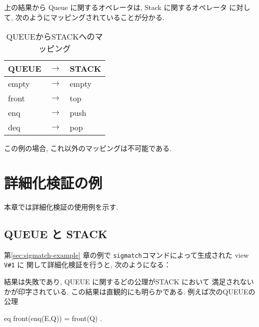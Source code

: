 上の結果から Queue に関するオペレータは, Stack に関するオペレータ
に対して, 次のようにマッピングされていることが分かる.
\begin{table}[htbp]
  \begin{center}
    \begin{tabular}{lcl}\hline
      QUEUE & $\rightarrow$ & STACK \\\hline
      empty & $\rightarrow$ & empty \\
      front & $\rightarrow$ & top \\
      enq & $\rightarrow$ & push \\
      deq & $\rightarrow$ & pop \\\hline
    \end{tabular}
    \caption{{QUEUEからSTACKへのマッピング}}
    \label{tab:queue-to-stack}
  \end{center}
\end{table}

\noindent
この例の場合, これ以外のマッピングは不可能である.

\section{詳細化検証の例}
\label{sec:refinement-check-example}

本章では詳細化検証の使用例を示す.

\subsection{QUEUE と STACK}
第\ref{sec:sigmatch-example} 章の例で
\texttt{sigmatch}コマンドによって生成された view \texttt{V\#1} に
関して詳細化検証を行うと, 次のようになる：

\begin{vvtm}
\end{vvtm}

結果は失敗であり, QUEUE に関するどの公理がSTACK において
満足されないかが印字されている. 
この結果は直観的にも明らかである.
例えば次のQUEUEの公理

\begin{vvtm}
\begin{simplev}
  eq front(enq(E,Q)) = front(Q) .
\end{simplev}
\end{vvtm}

